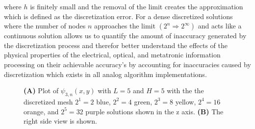 where $h$ is finitely small and the removal of the limit creates the approximation which is defined as the discretization error. For a dense discretized solutions where the number of nodes $n$ approaches the limit $\left(2^n \Rightarrow 2^{\infty} \right)$ and acts like a continuous solution allows us to quantify the amount of inaccuracy generated by the discretization process and therefor better understand the effects of the physical properties of the electrical, optical, and metatronic information processing on their achievable accuracy's by accounting for inaccuracies caused by discretization which exists in all analog algorithm implementations.

\begin{figure}[h]
\centering{}
\caption{\textbf{(A)} Plot of $\psi_{3,n}\left(x,y\right)$ with $L=5$ and $H=5$ with the the discretized mesh $2^1 = 2$ blue, $2^2 = 4$ green, $2^3 = 8$ yellow, $2^4 = 16$ orange, and $2^5 = 32$ purple solutions shown in the z axis. \textbf{(B)} The right side view is shown.}
\label{fig:discrete}
\end{figure}